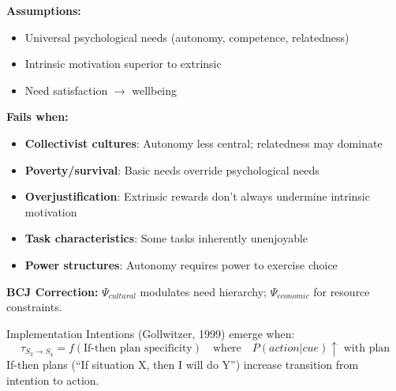 \begin{tcolorbox}[colback=red!5!white, colframe=red!75!black, title=Boundary Condition: Where SDT Fails]
\textbf{Assumptions:}
\begin{itemize}[nosep]
\item Universal psychological needs (autonomy, competence, relatedness)
\item Intrinsic motivation superior to extrinsic
\item Need satisfaction $\to$ wellbeing
\end{itemize}

\textbf{Fails when:}
\begin{itemize}[nosep]
\item \textbf{Collectivist cultures}: Autonomy less central; relatedness may dominate
\item \textbf{Poverty/survival}: Basic needs override psychological needs
\item \textbf{Overjustification}: Extrinsic rewards don't always undermine intrinsic motivation
\item \textbf{Task characteristics}: Some tasks inherently unenjoyable
\item \textbf{Power structures}: Autonomy requires power to exercise choice
\end{itemize}

\textbf{BCJ Correction:} $\Psi_{cultural}$ modulates need hierarchy; $\Psi_{economic}$ for resource constraints.
\end{tcolorbox}


\begin{theorem}
\label{thm:implementation-intentions}
Implementation Intentions (Gollwitzer, 1999) emerge when:
\begin{equation}
\boxed{\tau_{S_3 \to S_4} = f(\text{If-then plan specificity}) \quad \text{where} \quad P(action|cue) \uparrow \text{ with plan}}
\end{equation}
If-then plans (``If situation X, then I will do Y'') increase transition from intention to action.
\end{theorem}


